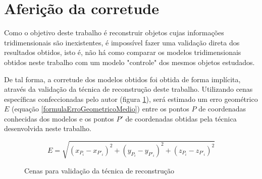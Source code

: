 \section{Aferição da corretude}

	Como o objetivo deste trabalho é reconstruir objetos cujas informações tridimensionais são inexistentes, é impossível fazer uma validação direta dos resultados obtidos, isto é, não há como comparar os modelos tridimensionais obtidos neste trabalho com um modelo "controle" dos mesmos objetos estudados.

	De tal forma, a corretude dos modelos obtidos foi obtida de forma implícita, através da validação da técnica de reconstrução deste trabalho. Utilizando cenas específicas confeccionadas pelo autor (figura \ref{cenasValidacao}), será estimado um erro geométrico $E$ (equação \ref{formulaErroGeometricoMedio}) entre os pontos $P$ de coordenadas conhecidas dos modelos e os pontos $P'$ de coordenadas obtidas pela técnica desenvolvida neste trabalho. 
	
\begin{equation}
	\label{formulaErroGeometricoMedio}
	E = \sqrt{(x_{P_i} - x_{P'_i})^2 + (y_{P_i} - y_{P'_i})^2 + (z_{P_i} - z_{P'_i})^2} 
\end{equation}
	
\begin{figure}[!htb]
	\centering
	\quad
	\quad
	\caption{Cenas para validação da técnica de reconstrução}
	\label{cenasValidacao}
\end{figure}

